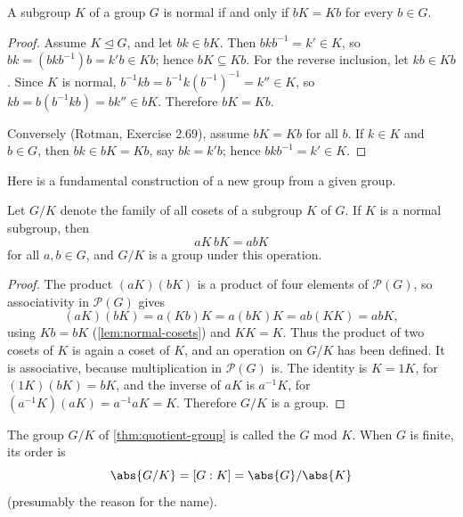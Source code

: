 \begin{lemma}\label{lem:normal-cosets}
	A subgroup \(K\) of a group \(G\) is normal if and only if \(bK = Kb\) for every
	\(b \in G\).
\end{lemma}

\begin{proof}
	Assume \(K \trianglelefteq G\), and let \(bk \in bK\). Then \(bkb^{-1} = k' \in K\), so
	\(bk = (bkb^{-1})b = k'b \in Kb\); hence \(bK \subseteq Kb\). For the reverse inclusion,
	let \(kb \in Kb\). Since \(K\) is normal, \(b^{-1}kb = b^{-1}k(b^{-1})^{-1} = k'' \in K\),
	so \(kb = b(b^{-1}kb) = bk'' \in bK\). Therefore \(bK = Kb\).

	Conversely (Rotman, Exercise 2.69), assume \(bK = Kb\) for all \(b\). If \(k \in K\) and
	\(b \in G\), then \(bk \in bK = Kb\), say \(bk = k'b\); hence
	\(bkb^{-1} = k' \in K\).
\end{proof}

Here is a fundamental construction of a new group from a given group.

\begin{theorem}\label{thm:quotient-group}
	Let \(G/K\) denote the family of all cosets of a subgroup \(K\) of \(G\). If \(K\) is a
	normal subgroup, then
	\[
		aK\,bK = abK
	\]
	for all \(a, b \in G\), and \(G/K\) is a group under this operation.
\end{theorem}

\begin{proof}
	The product \((aK)(bK)\) is a product of four elements of \(\mathcal P(G)\), so
	associativity in \(\mathcal P(G)\) gives
	\[
		(aK)(bK) = a(Kb)K = a(bK)K = ab(KK) = abK,
	\]
	using \(Kb = bK\) (\autoref{lem:normal-cosets}) and \(KK = K\). Thus the product of two
	cosets of \(K\) is again a coset of \(K\), and an operation on \(G/K\) has been defined.
	It is associative, because multiplication in \(\mathcal P(G)\) is. The identity is
	\(K = 1K\), for \((1K)(bK) = bK\), and the inverse of \(aK\) is \(a^{-1}K\), for
	\((a^{-1}K)(aK) = a^{-1}aK = K\). Therefore \(G/K\) is a group.
\end{proof}

\begin{definition}
	The group \(G/K\) of \autoref{thm:quotient-group} is called the 
	\(G\) mod \(K\). When \(G\) is finite, its order is
	\[
		\abs{G/K} = [G : K] = \abs{G}/\abs{K}
	\]
	(presumably the reason for the name).
\end{definition}


